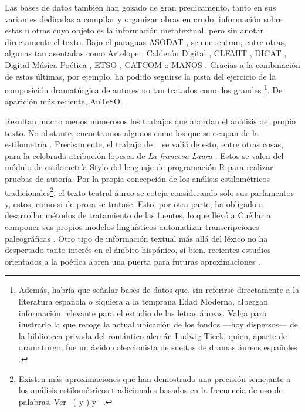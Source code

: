 Las bases de datos también han gozado de gran predicamento, tanto en sus variantes dedicadas a compilar y organizar obras en crudo, información sobre estas u otras cuyo objeto es la información metatextual, pero sin anotar directamente el texto. Bajo el paraguas ASODAT \parencite{ferrer2023}, se encuentran, entre otras, algunas tan asentadas como Artelope \parencite{oleza2013}, Calderón Digital \parencite{antonucci2018}, CLEMIT \parencite{urzaiz2020}, DICAT \parencite{dicat}, Digital Música Poética \parencite{dgp}, ETSO \parencite{cuellar2018}, CATCOM \parencite{ferrer2013} o MANOS \parencite{greer2022}. Gracias a la combinación de estas últimas, por ejemplo, ha podido seguirse la pista del ejercicio de la composición dramatúrgica de autores no tan tratados como los grandes \parencite{garciareidy2019}\footnote{Además, habría que señalar bases de datos que, sin referirse directamente a la literatura española o siquiera a la temprana Edad Moderna, albergan información relevante para el estudio de las letras áureas. Valga para ilustrarlo la que recoge la actual ubicación de los fondos —hoy dispersos— de la biblioteca privada del romántico alemán Ludwig Tieck, quien, aparte de dramaturgo, fue un ávido coleccionista de sueltas de dramas áureos españoles \parencite{tieck2018}.}. De aparición más reciente, AuTeSO \parencite{auteso}.

Resultan mucho menos numerosos los trabajos que abordan el análisis del propio texto. No obstante, encontramos algunos como los que se ocupan de la estilometría \parencites{cuellar2018}{hernandezetal2022}. Precisamente, el trabajo de
\citeauthor{cuellar2023}~\parencite*{cuellar2023} se valió de esto, entre otras cosas, para la celebrada atribución lopesca de \textit{La francesa Laura} \parencite{lope_laura}. Estos se valen del módulo de estilometría Stylo \parencite{eder2016} del lenguaje de programación R para realizar pruebas de autoría. Por la propia concepción de los análisis estilométricos tradicionales\footnote{Existen más aproximaciones que han demostrado una precisión semejante a los análisis estilométricos tradicionales basados en la frecuencia de uso de palabras. Ver \citeauthor{kroll2022a}~(\cite*{kroll2022a} y \cite*{kroll2023}) y \citeauthor{plechac2018}~\parencite*{plechac2018}.}, el texto teatral áureo se coteja considerando solo sus parlamentos y, estos, como si de prosa se tratase. Esto, por otra parte, ha obligado a desarrollar métodos de tratamiento de las fuentes, lo que llevó a Cuéllar a componer sus propios modelos lingüísticos  automatizar transcripciones paleográficas \parencite{cuellar2023b}. Otro tipo de información textual más allá del léxico no ha despertado tanto interés en el ámbito hispánico, si bien, recientes estudios orientados a la poética abren una puerta para futuras aproximaciones \parencite{hernandez2022a}.

